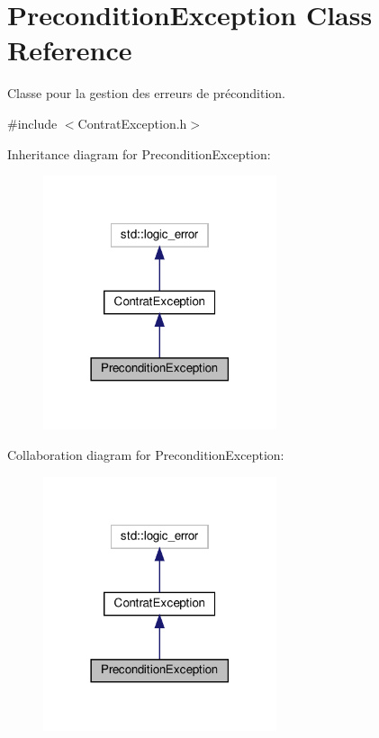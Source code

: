 \hypertarget{classPreconditionException}{}\section{Precondition\+Exception Class Reference}
\label{classPreconditionException}


Classe pour la gestion des erreurs de précondition.  




{\ttfamily \#include $<$Contrat\+Exception.\+h$>$}



Inheritance diagram for Precondition\+Exception\+:\nopagebreak
\begin{figure}[H]
\begin{center}
\leavevmode
\includegraphics[width=194pt]{classPreconditionException__inherit__graph}
\end{center}
\end{figure}


Collaboration diagram for Precondition\+Exception\+:\nopagebreak
\begin{figure}[H]
\begin{center}
\leavevmode
\includegraphics[width=194pt]{classPreconditionException__coll__graph}
\end{center}
\end{figure}
